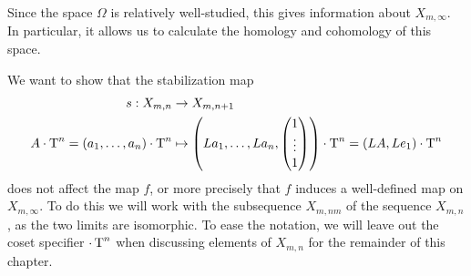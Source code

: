Since the space $\Omega$ is relatively well-studied, this gives
information about $X_{m,\infty}$. In particular, it allows us to
calculate the homology and cohomology of this space.

We want to show that the stabilization map
\begin{align*}
  s : X_{m,n} &\to X_{m,n+1} \\
  A\cdot \operatorname{T}^n = (a_1,\dots,a_n)\cdot \operatorname{T}^n 
              &\mapsto \left(La_1,\dots,La_n,
    \begin{pmatrix}
      1 \\
      \vdots\\
      1
    \end{pmatrix} 
\right) \cdot \operatorname{T}^n = (LA,Le_1) \cdot \operatorname{T}^n
\end{align*}
does not affect the map $f$, or more precisely that $f$ induces a
well-defined map on $X_{m,\infty}$. To do this we will work with the
subsequence $X_{m,nm}$ of the sequence $X_{m,n}$, as the two limits
are isomorphic.  To
ease the notation, we will leave out the coset specifier $\cdot \operatorname{T}^n$
when discussing elements of $X_{m,n}$ for the remainder of this
chapter.


